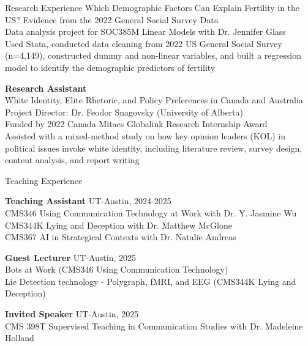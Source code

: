\documentclass[
	11pt, %
]{resume} %
\begin{document}
\begin{rSection}{Research Experience}
  Which Demographic Factors Can Explain Fertility in the US? Evidence from the 2022 General Social Survey Data\\
\textbullet\enspace Data analysis project for SOC385M Linear Models with Dr. Jennifer Glass\\    
\textbullet\enspace Used Stata, conducted data cleaning from 2022 US General Social Survey (n=4,149), constructed dummy and non-linear variables, and built a regression model to identify the demographic predictors of fertility

    \textbf{Research Assistant}\\ 
     White Identity, Elite Rhetoric, and Policy Preferences in Canada and Australia\\
\textbullet\enspace Project Director: Dr. Feodor Snagovsky (University of Alberta)\\    
\textbullet\enspace Funded by 2022 Canada Mitacs Globalink Research Internship Award\\
\textbullet\enspace Assisted with a mixed-method study on how key opinion leaders (KOL) in political issues invoke white identity, including literature review, survey design, content analysis, and report writing\\


	
\end{rSection}




\begin{rSection}{Teaching Experience}

    \textbf{Teaching Assistant} \hfill UT-Austin, 2024-2025\\
\textbullet\enspace CMS346 Using Communication Technology at Work with Dr. Y. Jasmine Wu\\
\textbullet\enspace CMS344K Lying and Deception with Dr. Matthew McGlone\\
\textbullet\enspace CMS367 AI in Strategical Contexts with Dr. Natalie Andreas 
    
    \textbf{Guest Lecturer} \hfill UT-Austin, 2025\\
\textbullet\enspace Bots at Work (CMS346 Using Communication Technology)\\
\textbullet\enspace Lie Detection technology - Polygraph, fMRI, and EEG (CMS344K Lying and Deception)

    \textbf{Invited Speaker} \hfill UT-Austin, 2025\\
\textbullet\enspace CMS 398T Supervised Teaching in Communication Studies with Dr. Madeleine Holland 




\end{rSection}
\end{document}
